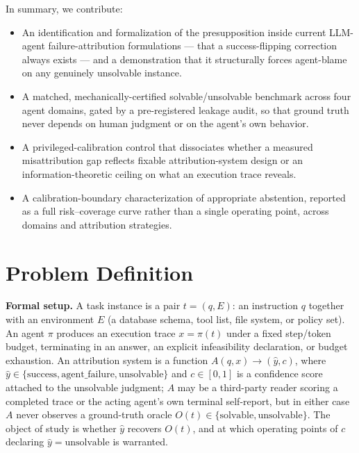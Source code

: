 \documentclass[11pt]{article}
\begin{document}
In summary, we contribute:
\begin{itemize}[leftmargin=1.4em]
\item An identification and formalization of the presupposition inside current LLM-agent failure-attribution formulations --- that a success-flipping correction always exists --- and a demonstration that it structurally forces agent-blame on any genuinely unsolvable instance.
\item A matched, mechanically-certified solvable/unsolvable benchmark across four agent domains, gated by a pre-registered leakage audit, so that ground truth never depends on human judgment or on the agent's own behavior.
\item A privileged-calibration control that dissociates whether a measured misattribution gap reflects fixable attribution-system design or an information-theoretic ceiling on what an execution trace reveals.
\item A calibration-boundary characterization of appropriate abstention, reported as a full risk--coverage curve rather than a single operating point, across domains and attribution strategies.
\end{itemize}

\section{Problem Definition}

\noindent\textbf{Formal setup.} A task instance is a pair $t=(q,E)$: an instruction $q$ together with an environment $E$ (a database schema, tool list, file system, or policy set). An agent $\pi$ produces an execution trace $x = \pi(t)$ under a fixed step/token budget, terminating in an answer, an explicit infeasibility declaration, or budget exhaustion. An attribution system is a function $A(q,x) \to (\hat{y}, c)$, where $\hat{y} \in \{\text{success}, \text{agent\_failure}, \text{unsolvable}\}$ and $c \in [0,1]$ is a confidence score attached to the unsolvable judgment; $A$ may be a third-party reader scoring a completed trace or the acting agent's own terminal self-report, but in either case $A$ never observes a ground-truth oracle $O(t) \in \{\text{solvable}, \text{unsolvable}\}$. The object of study is whether $\hat{y}$ recovers $O(t)$, and at which operating points of $c$ declaring $\hat{y}=\text{unsolvable}$ is warranted.
\end{document}
